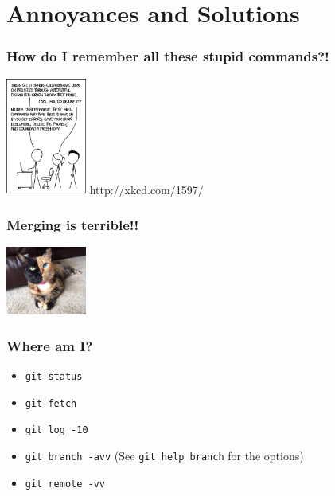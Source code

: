 \documentclass{beamer}
\begin{document}
\section{Annoyances and Solutions}
\begin{frame}[fragile]
\frametitle{How do I remember all these stupid commands?!}
\includegraphics[width=100px]{git.png}
http://xkcd.com/1597/
\end{frame}




\begin{frame}[fragile]
\frametitle{Merging is terrible!!}
\includegraphics[width=100px]{chimera.jpg}
\end{frame}



\begin{frame}[fragile]
\frametitle{Where am I?}

\begin{itemize}
\item \lstinline{git status}
\item \lstinline{git fetch}
\item \lstinline{git log -10}
\item \lstinline{git branch -avv} (See \lstinline{git help branch} for the options)
\item \lstinline{git remote -vv}
\end{itemize}



\end{frame}
\end{document}
